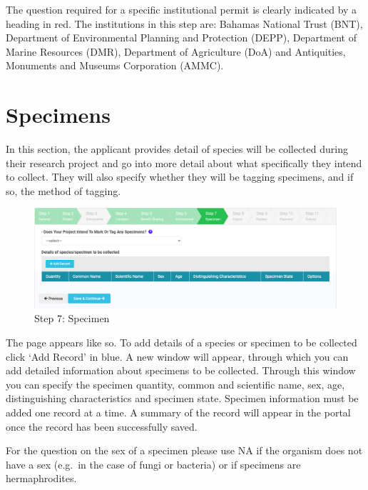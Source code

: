 \documentclass[
]{book}
\begin{document}
The question required for a specific institutional permit is clearly indicated by a heading in red. The institutions in this step are: Bahamas National Trust (BNT), Department of Environmental Planning and Protection (DEPP), Department of Marine Resources (DMR), Department of Agriculture (DoA) and Antiquities, Monuments and Museums Corporation (AMMC).

\hypertarget{specimens}{%
\chapter{Specimens}\label{specimens}}

In this section, the applicant provides detail of species will be collected during their research project and go into more detail about what specifically they intend to collect. They will also specify whether they will be tagging specimens, and if so, the method of tagging.

\begin{figure}
\centering
\includegraphics{images/specimen_section.png}
\caption{Step 7: Specimen}
\end{figure}

The page appears like so. To add details of a species or specimen to be collected click `Add Record' in blue. A new window will appear, through which you can add detailed information about specimens to be collected. Through this window you can specify the specimen quantity, common and scientific name, sex, age, distinguishing characteristics and specimen state. Specimen information must be added one record at a time. A summary of the record will appear in the portal once the record has been successfully saved.

For the question on the sex of a specimen please use NA if the organism does not have a sex (e.g.~in the case of fungi or bacteria) or if specimens are hermaphrodites.
\end{document}
